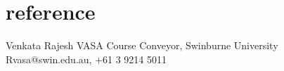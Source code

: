 \documentclass[]{friggeri-cv} %
\begin{document}
\section{reference}

\begin{entrylist}
\entry
{}
{Venkata Rajesh VASA}
{Course Conveyor, Swinburne University}
{Rvasa@swin.edu.au, +61 3 9214 5011}
\end{entrylist}
\end{document}
